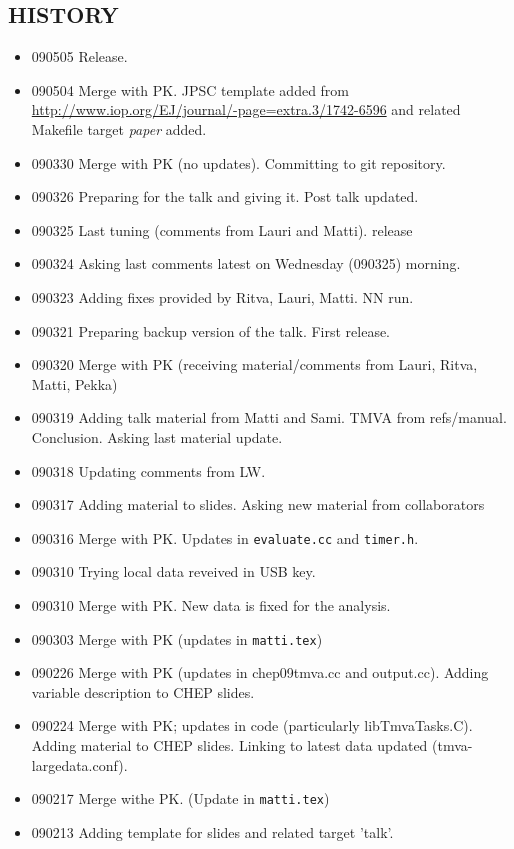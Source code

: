 \begin{appendix}
\section{HISTORY}
\begin{itemize}
\item 090505 Release.
\item 090504  Merge with PK. JPSC template added from \url{http://www.iop.org/EJ/journal/-page=extra.3/1742-6596} and
related Makefile target {\em paper} added.
\item 090330  Merge with PK (no updates). Committing to git repository.
\item 090326 Preparing for the talk and giving it. Post talk updated.
\item 090325 Last tuning (comments from Lauri and Matti). release
\item 090324 Asking last comments latest on Wednesday (090325) morning. 
\item 090323 Adding fixes provided by Ritva, Lauri, Matti. NN run.
\item 090321 Preparing backup version of the talk. First release.
\item 090320 Merge with PK (receiving material/comments from Lauri, Ritva, Matti, Pekka)
\item 090319 Adding talk material from Matti and Sami. 
TMVA from refs/manual. Conclusion. Asking last material update.
\item 090318 Updating comments from LW.
\item 090317 Adding material to slides. Asking new material from collaborators
\item 090316 Merge with PK. Updates in {\tt evaluate.cc} and {\tt timer.h}.
\item 090310 Trying local data reveived in USB key.
\item 090310 Merge with PK. New data is fixed for the analysis.
\item 090303 Merge with PK (updates in {\tt matti.tex})
\item 090226 Merge with PK (updates in chep09tmva.cc and output.cc). 
Adding variable description to CHEP slides.
\item 090224 Merge with PK; updates in code (particularly libTmvaTasks.C). Adding material to CHEP slides.
Linking to latest data updated (tmva-largedata.conf). 
\item 090217 Merge withe PK. (Update in {\tt matti.tex})
\item 090213 Adding template for slides  \cite{ah09aTalk.tex} and related target 'talk'. 

\end{itemize}
\end{appendix}
